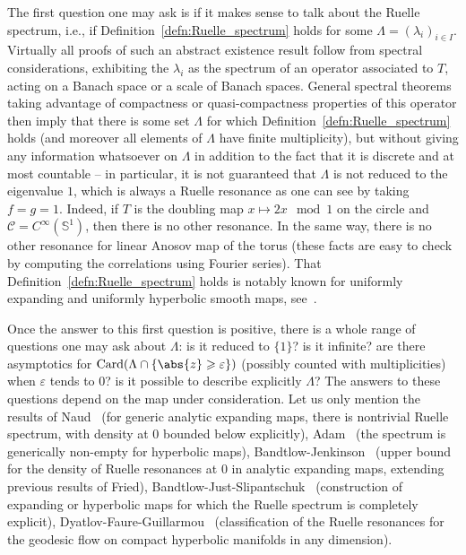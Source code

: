 \documentclass[11pt, a4paper, oneside, final, pagebackref]{amsart}
\newcommand{\boC}{\mathcal{C}}
\newcommand{\Sbb}{\mathbb{S}}
\DeclareMathOperator{\Card}{Card}
\renewcommand{\epsilon}{\varepsilon}
\renewcommand{\geq}{\geqslant}
\theoremstyle{definition}
\numberwithin{equation}{section}
\begin{document}
The first question one may ask is if it makes sense to talk about the Ruelle
spectrum, i.e., if Definition~\ref{defn:Ruelle_spectrum} holds for some
$\Lambda=(\lambda_i)_{i\in I}$. Virtually all proofs of such an abstract
existence result follow from spectral considerations, exhibiting the
$\lambda_i$ as the spectrum of an operator associated to $T$, acting on a
Banach space or a scale of Banach spaces. General spectral theorems taking
advantage of compactness or quasi-compactness properties of this operator
then imply that there is some set $\Lambda$ for which
Definition~\ref{defn:Ruelle_spectrum} holds (and moreover all elements of
$\Lambda$ have finite multiplicity), but without giving any information
whatsoever on $\Lambda$ in addition to the fact that it is discrete and at
most countable -- in particular, it is not guaranteed that $\Lambda$ is not
reduced to the eigenvalue $1$, which is always a Ruelle resonance as one can
see by taking $f=g=1$. Indeed, if $T$ is the doubling map $x \mapsto 2 x \mod
1$ on the circle and $\boC=C^\infty(\Sbb^1)$, then there is no other
resonance. In the same way, there is no other resonance for linear Anosov map
of the torus (these facts are easy to check by computing the correlations
using Fourier series). That Definition~\ref{defn:Ruelle_spectrum} holds is
notably known for uniformly expanding and uniformly hyperbolic smooth maps,
see~\cite{ruelle_fredholm, bt_aniso,GL_Anosov2}.

Once the answer to this first question is positive, there is a whole range of
questions one may ask about $\Lambda$: is it reduced to $\{1\}$? is it
infinite? are there asymptotics for $\Card (\Lambda \cap \{\abs{z} \geq
\epsilon\})$ (possibly counted with multiplicities) when $\epsilon$ tends to
$0$? is it possible to describe explicitly $\Lambda$? The answers to these
questions depend on the map under consideration. Let us only mention the
results of Naud~\cite{naud_lower_bound} (for generic analytic expanding maps,
there is nontrivial Ruelle spectrum, with density at $0$ bounded below
explicitly), Adam~\cite{adam_hyperbolic} (the spectrum is generically
non-empty for hyperbolic maps),
Bandtlow-Jenkinson~\cite{bandtlow_jenkinson_upper} (upper bound for the
density of Ruelle resonances at $0$ in analytic expanding maps, extending
previous results of Fried),
Bandtlow-Just-Slipantschuk~\cite{bandtlow_just_slipantschuk_expanding,
bandtlow_just_slipantschuk_hyperbolic} (construction of expanding or
hyperbolic maps for which the Ruelle spectrum is completely explicit),
Dyatlov-Faure-Guillarmou~\cite{dyatlov_faure_guillarmou} (classification of
the Ruelle resonances for the geodesic flow on compact hyperbolic manifolds
in any dimension).
\end{document}
